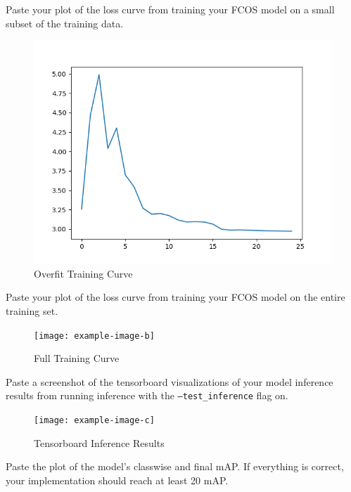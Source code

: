 \documentclass[11pt,addpoints,answers]{exam}
\numberwithin{equation}{section} %
\numberwithin{figure}{section} %
\numberwithin{table}{section} %
\begin{document}
\begin{questions}
\question Paste your plot of the loss curve from training your FCOS model on a small subset of the training data.

\begin{figure}[H]
    \centering
    \includegraphics{./results/q3/loss_overfit.png}
    \caption{Overfit Training Curve}
    \label{fig:overfit_plot}
\end{figure}
\question Paste your plot of the loss curve from training your FCOS model on the entire training set.

\begin{figure}[H]
    \centering
    \texttt{[image: example-image-b]}
    \caption{Full Training Curve}
    \label{fig:full_loss_plot}
\end{figure}

\question Paste a screenshot of the tensorboard visualizations of your model inference results from running inference with the \texttt{--test\_inference} flag on.

\begin{figure}[H]
    \centering
    \texttt{[image: example-image-c]}
    \caption{Tensorboard Inference Results}
    \label{fig:inference_results}
\end{figure}

\question Paste the plot of the model's classwise and final mAP. If everything is correct, your implementation should reach at least 20 mAP.


\end{questions}
\end{document}
